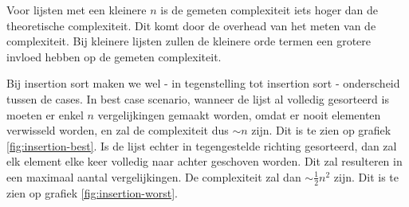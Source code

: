 \documentclass[a4paper]{article}
\begin{document}
\par

Voor lijsten met een kleinere $n$ is de gemeten complexiteit iets hoger dan de theoretische complexiteit.
Dit komt door de overhead van het meten van de complexiteit. Bij kleinere lijsten zullen de kleinere orde termen een grotere
invloed hebben op de gemeten complexiteit.

\par

Bij insertion sort maken we wel - in tegenstelling tot insertion sort - onderscheid tussen de cases. In best case scenario, wanneer de lijst al volledig gesorteerd is
moeten er enkel $n$ vergelijkingen gemaakt worden, omdat er nooit elementen verwisseld worden, en zal de complexiteit dus $\sim n$ zijn. Dit is te zien op grafiek \ref{fig:insertion-best}.
Is de lijst echter in tegengestelde richting gesorteerd, dan zal elk element elke keer volledig naar achter geschoven worden. Dit zal resulteren in een maximaal aantal vergelijkingen.
De complexiteit zal dan $\sim \frac{1}{2}n^2$ zijn. Dit is te zien op grafiek \ref{fig:insertion-worst}.
\end{document}
